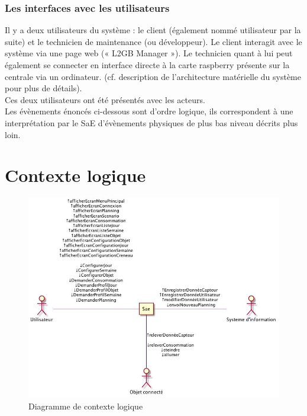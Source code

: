 \documentclass[10pt,a4paper]{report}
\begin{document}
			\subsection{Les interfaces avec les utilisateurs}
			
Il y a deux utilisateurs du système : le client (également nommé utilisateur par la suite) et le technicien de maintenance (ou développeur). Le client interagit avec le système via une page web (« L2GB Manager »). Le technicien quant à lui peut également se connecter en interface directe à la carte raspberry présente sur la centrale via un ordinateur. (cf. description de l’architecture matérielle du système pour plus de détails).\\

Ces deux utilisateurs ont été présentés avec les acteurs.\\

Les évènements énoncés ci-dessous sont d’ordre logique, ils correspondent à une interprétation par le SaE d’évènements physiques de plus bas niveau décrits plus loin.			


	\chapter{Contexte logique}
	
\begin{figure}[H]
	\centering
	\includegraphics[scale=0.55]{diagContexteLogique}
	\caption{Diagramme de contexte logique}
	\label{diagContexteLogique}
\end{figure}
\newpage
\end{document}
